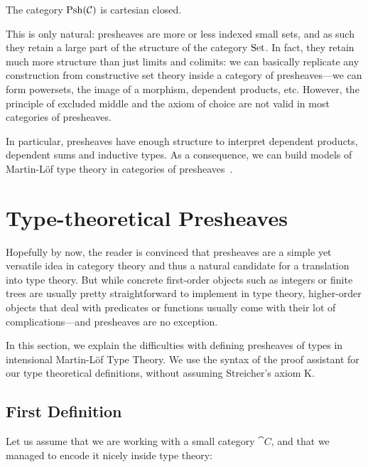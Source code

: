 \begin{theorem}
    The category \( \mathrm{Psh}(\mathcal{C}) \) is cartesian closed.
\end{theorem}

This is only natural: presheaves are more or less indexed small sets, and as 
such they retain a large part of the structure of the category \( \mathrm{Set} \). In fact, they
retain much more structure than just limits and colimits: we can basically 
% 
% 
replicate any construction from constructive set theory inside a category of 
presheaves---we can form powersets, the image of a morphism, dependent 
products, etc. However, the principle of excluded middle and the axiom of 
choice are not valid in most categories of presheaves.

In particular, presheaves have enough structure to interpret 
dependent products, dependent sums and inductive types. As a consequence, we
can build models of Martin-Löf type theory in categories of 
presheaves~.

\section{Type-theoretical Presheaves}
\label{sec:intensional-problems}

Hopefully by now, the reader is convinced that presheaves are a simple yet 
versatile idea in category theory and thus a natural candidate for a 
translation into type theory.
% 
But while concrete first-order objects such as integers or finite trees 
are usually pretty straightforward to implement in type theory, higher-order objects 
that deal with predicates or functions usually come with their lot of 
complications---and presheaves are no exception.

In this section, we explain the difficulties with defining presheaves of types
in intensional Martin-Löf Type Theory. 
% 
We use the syntax of the \Agda proof assistant for our type theoretical 
definitions, without assuming Streicher's axiom K.

\subsection{First Definition}

Let us assume that we are working with a small category \( \cat{C} \), and that we
managed to encode it nicely inside type theory:

